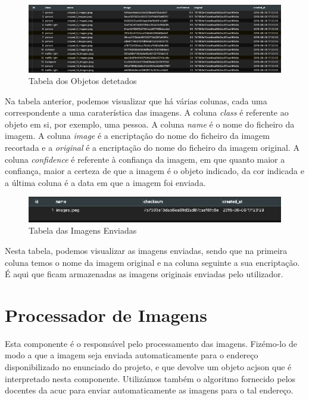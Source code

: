 \documentclass{report}
\begin{document}
\begin{figure}[!ht]
    \centering
    \includegraphics[scale = 0.5]{dbObjects.png}
    \caption{Tabela dos Objetos detetados}
    \label{fig:bdobjs}
\end{figure}

Na tabela anterior, podemos visualizar que há várias colunas, cada uma correspondente a uma caraterística das imagens. A coluna \textit{class} é referente ao objeto em si, por exemplo, uma pessoa. A coluna \textit{name} é o nome do ficheiro da imagem. A coluna \textit{image} é a encriptação do nome do ficheiro da imagem recortada e a \textit{original} é a encriptação do nome do ficheiro da imagem original. A coluna \textit{confidence} é referente à confiança da imagem, em que quanto maior a confiança, maior a certeza de que a imagem é o objeto indicado, da cor indicada e a última coluna é a data em que a imagem foi enviada.


\begin{figure}[!ht]
    \centering
    \includegraphics[scale = 0.7]{dbImagens.png}
    \caption{Tabela das Imagens Enviadas}
    \label{fig:bdimages}
\end{figure}

Nesta tabela, podemos visualizar as imagens enviadas, sendo que na primeira coluna temos o nome da imagem original e na coluna seguinte a sua encriptação. É aqui que ficam armazenadas as imagens originais enviadas pelo utilizador.

\chapter{Processador de Imagens}
\label{chap.processador}
Esta componente é o responsável pelo processamento das imagens. Fizémo-lo de modo a que a imagem seja enviada automaticamente para o endereço disponibilizado no enunciado do projeto, e que devolve um objeto ac{json} que é interpretado nesta componente. Utilizámos também o algoritmo fornecido pelos docentes da ac{uc} para enviar automaticamente as imagens para o tal endereço.
\end{document}
